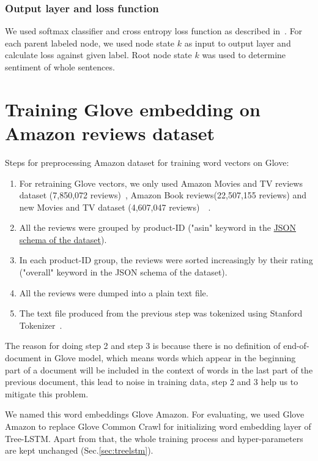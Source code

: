 \subsubsection{Output layer and loss function}
We used softmax classifier and cross entropy loss function as described in~\cite{treeLSTM}.  
For each parent labeled node, we used node state $k$ as input to output layer and calculate loss against given label. 
Root node state $k$ was used to determine sentiment of whole sentences.

\hypertarget{sec:Glove-Amazon}{\section{Training Glove embedding on Amazon reviews dataset}}
\label{sec:gloveamazone}
Steps for preprocessing Amazon dataset for training word vectors on Glove:
\begin{enumerate}
\item For retraining Glove vectors, we only used Amazon Movies and TV reviews dataset (7,850,072 reviews)~\cite{mcauley2013hidden}, Amazon Book reviews(22,507,155 reviews) and new Movies and TV dataset (4,607,047 reviews)~\cite{McAuleyTSH15}~\cite{HeM16}.
\item All the reviews were grouped by product-ID ("asin" keyword in the \hyperref[sec:amazon]{JSON schema of the dataset}).
\item In each product-ID group, the reviews were sorted increasingly by their rating ("overall" keyword in the JSON schema of the dataset).
\item All the reviews were dumped into a plain text file.
\item The text file produced from the previous step was tokenized using Stanford Tokenizer~\cite{tokenizerpart}.
\end{enumerate}

The reason for doing step 2 and step 3 is because there is no definition of end-of-document in Glove model, which means words which appear in the beginning part of a document will be included in the context of words in the last part of the previous document, this lead to noise in training data, step 2 and 3 help us to mitigate this problem.

We named this word embeddings Glove Amazon.
For evaluating, we used Glove Amazon to replace Glove Common Crawl for initializing word embedding layer of Tree-LSTM.
Apart from that, the whole training process and hyper-parameters are kept unchanged (Sec.\ref{sec:treelstm}).

